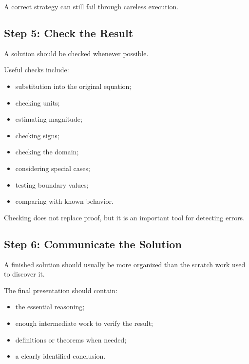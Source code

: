 A correct strategy can still fail through careless execution.

\subsection{Step 5: Check the Result}
\label{subsec:check-result}

A solution should be checked whenever possible.

Useful checks include:

\begin{itemize}
    \item substitution into the original equation;
    \item checking units;
    \item estimating magnitude;
    \item checking signs;
    \item checking the domain;
    \item considering special cases;
    \item testing boundary values;
    \item comparing with known behavior.
\end{itemize}

Checking does not replace proof, but it is an important tool for detecting
errors.

\subsection{Step 6: Communicate the Solution}
\label{subsec:communicate-solution}

A finished solution should usually be more organized than the scratch work
used to discover it.

The final presentation should contain:

\begin{itemize}
    \item the essential reasoning;
    \item enough intermediate work to verify the result;
    \item definitions or theorems when needed;
    \item a clearly identified conclusion.
\end{itemize}

